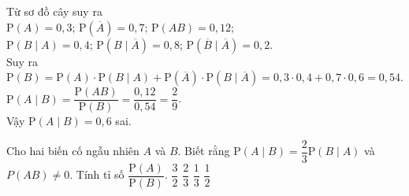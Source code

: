 \begin{ex}
{\begin{center}
		\end{center}
	Từ sơ đồ cây suy ra\\
		$\mathrm{P}\left(A\right)= 0{,}3$; $\mathrm{P}\left(\overline{A}\right)= 0{,}7$;
		$\mathrm{P}\left(A B\right)= 0{,}12$;\\
		$\mathrm{P}\left(B\mid A\right)= 0{,}4$; $\mathrm{P}\left(B\mid \overline{A}\right)= 0{,}8$;
		$\mathrm{P}\left(\overline{B}\mid \overline{A}\right)=0{,}2$.\\
		Suy ra
		$\mathrm{P}\left(B\right)= \mathrm{P}\left(A\right)\cdot \mathrm{P}(B\mid A)
		+ \mathrm{P}\left(\overline{A}\right)\cdot \mathrm{P}(B\mid \overline{A})
		= 0{,}3\cdot 0{,}4 + 0{,}7\cdot 0{,}6 = 0{,}54 $.\\
		$\mathrm{P}\left(A\mid B\right)= \dfrac{\mathrm{P}\left(AB\right)}{\mathrm{P}\left(B\right)}
			=\dfrac{0{,}12}{0{,}54}=\dfrac{2}{9}$.\\
		Vậy $\mathrm{P}\left(A\mid B\right)=0{,}6$ sai.

	}
\end{ex}
\begin{ex}%
Cho hai biến cố ngẫu nhiên $A$ và $B$. Biết rằng $\mathrm{P}\left(A\mid B\right)= \dfrac{2}{3} \mathrm{P}\left(B\mid A\right)$ và $P\left(AB\right) \ne 0$. Tính tỉ số $\dfrac{\mathrm{P}\left(A\right)}{\mathrm{P}\left(B\right)}$.
	\choice
	{$\dfrac{3}{2}$}
	{\True $\dfrac{2}{3}$}
	{$\dfrac{1}{3}$}
	{$\dfrac{1}{2}$}
\end{ex}
